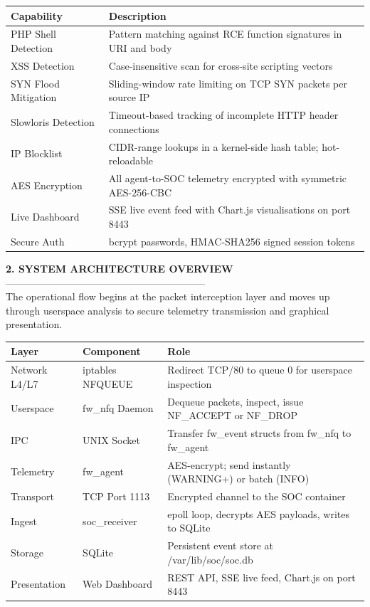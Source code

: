 \documentclass[12pt,a4paper]{article}
\newcommand{\thfmt}[1]{\textbf{#1}}
\begin{document}
\begin{center}
\begin{tabular}{L{4.5cm} L{10cm}}
\hline
\thfmt{Capability} & \thfmt{Description} \\
\hline
PHP Shell Detection  & Pattern matching against RCE function signatures in URI and body \\
XSS Detection        & Case-insensitive scan for cross-site scripting vectors \\
SYN Flood Mitigation & Sliding-window rate limiting on TCP SYN packets per source IP \\
Slowloris Detection  & Timeout-based tracking of incomplete HTTP header connections \\
IP Blocklist         & CIDR-range lookups in a kernel-side hash table; hot-reloadable \\
AES Encryption       & All agent-to-SOC telemetry encrypted with symmetric AES-256-CBC \\
Live Dashboard       & SSE live event feed with Chart.js visualisations on port 8443 \\
Secure Auth          & bcrypt passwords, HMAC-SHA256 signed session tokens \\
\hline
\end{tabular}
\end{center}

\vspace{1.5em}
\textbf{2. SYSTEM ARCHITECTURE OVERVIEW}\\
------------------------------------------------------------\\
The operational flow begins at the packet interception layer and moves up through userspace analysis to secure telemetry transmission and graphical presentation.

\begin{center}
\begin{tabular}{L{3.5cm} L{3.5cm} L{7.5cm}}
\hline
\thfmt{Layer} & \thfmt{Component} & \thfmt{Role} \\
\hline
Network L4/L7 & iptables NFQUEUE & Redirect TCP/80 to queue 0 for userspace inspection \\
Userspace     & fw\_nfq Daemon   & Dequeue packets, inspect, issue NF\_ACCEPT or NF\_DROP \\
IPC           & UNIX Socket      & Transfer fw\_event structs from fw\_nfq to fw\_agent \\
Telemetry     & fw\_agent        & AES-encrypt; send instantly (WARNING+) or batch (INFO) \\
Transport     & TCP Port 1113    & Encrypted channel to the SOC container \\
Ingest        & soc\_receiver    & epoll loop, decrypts AES payloads, writes to SQLite \\
Storage       & SQLite           & Persistent event store at /var/lib/soc/soc.db \\
Presentation  & Web Dashboard    & REST API, SSE live feed, Chart.js on port 8443 \\
\hline
\end{tabular}
\end{center}
\end{document}
